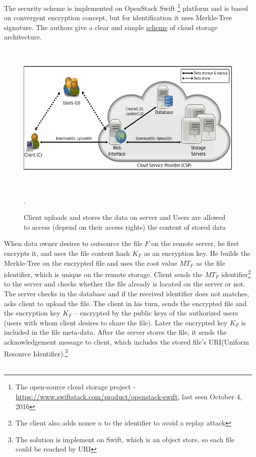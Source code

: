 \documentclass[12pt]{article}
\begin{document}
The security scheme is implemented on OpenStack Swift \footnote{The open-source cloud storage project - \url{https://www.swiftstack.com/product/openstack-swift}, last seen October 4, 2016} platform and is based on  convergent encryption concept\cite{CovergentEnc}, but for identification it uses Merkle-Tree signature. The authors give a clear and simple \hyperref[fig:ConvMT]{scheme} of cloud storage architecture.
\begin{figure}[ht] 
\begin{center}
\includegraphics[height=210pt,width=400pt]{ConvMT}
\caption{Client uploads and stores the data on server and Users are allowed to access (depend on their access rights) the content of stored data \cite{Kaaniche}}
\label{fig:ConvMT} .
\end{center}
\end{figure}
When data owner desires to outsource the file $F$ on the remote server, he first encrypts it, and uses the file content hash $K_F$ as an encryption key. He builds the Merkle-Tree on the encrypted file and  uses the root value $MT_F$ as the file identifier, which is unique on the remote storage. Client sends the $MT_F$ identifier\footnote{The client also adds nonce $n$ to the identifier to avoid a replay attack} to the server and checks whether the file already is located on the server or not. The server checks in the database and if the received identifier does not matches, asks client to upload the file. The client in his turn, sends the encrypted file and the encryption key $K_F$ -- encrypted by the public keys of the authorized users (users with whom client desires to share the file). Later the encrypted key $K_F$ is included in the file meta-data. After the server stores the file, it sends the acknowledgement message to client, which includes the stored file's URI(Uniform Resource Identifier).\footnote{The solution is implement on Swift, which is an object store, so each file could be reached by URI}\\\\
\end{document}
